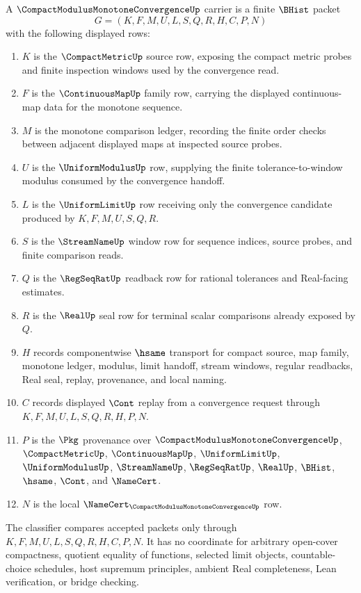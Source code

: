 \begin{definition}
\label{def:compact-modulus-monotone-convergence-carrier}
A $\CompactModulusMonotoneConvergenceUp$ carrier is a finite $\BHist$ packet
$$
G=(K,F,M,U,L,S,Q,R,H,C,P,N)
$$
with the following displayed rows:
\begin{enumerate}
\item $K$ is the $\CompactMetricUp$ source row, exposing the compact metric probes and finite inspection windows used by the convergence read.
\item $F$ is the $\ContinuousMapUp$ family row, carrying the displayed continuous-map data for the monotone sequence.
\item $M$ is the monotone comparison ledger, recording the finite order checks between adjacent displayed maps at inspected source probes.
\item $U$ is the $\UniformModulusUp$ row, supplying the finite tolerance-to-window modulus consumed by the convergence handoff.
\item $L$ is the $\UniformLimitUp$ row receiving only the convergence candidate produced by $K,F,M,U,S,Q,R$.
\item $S$ is the $\StreamNameUp$ window row for sequence indices, source probes, and finite comparison reads.
\item $Q$ is the $\RegSeqRatUp$ readback row for rational tolerances and Real-facing estimates.
\item $R$ is the $\RealUp$ seal row for terminal scalar comparisons already exposed by $Q$.
\item $H$ records componentwise $\hsame$ transport for compact source, map family, monotone ledger, modulus, limit handoff, stream windows, regular readbacks, Real seal, replay, provenance, and local naming.
\item $C$ records displayed $\Cont$ replay from a convergence request through $K,F,M,U,L,S,Q,R,H,P,N$.
\item $P$ is the $\Pkg$ provenance over $\CompactModulusMonotoneConvergenceUp$, $\CompactMetricUp$, $\ContinuousMapUp$, $\UniformLimitUp$, $\UniformModulusUp$, $\StreamNameUp$, $\RegSeqRatUp$, $\RealUp$, $\BHist$, $\hsame$, $\Cont$, and $\NameCert$.
\item $N$ is the local $\NameCert_{\CompactModulusMonotoneConvergenceUp}$ row.
\end{enumerate}
The classifier compares accepted packets only through $K,F,M,U,L,S,Q,R,H,C,P,N$. It has no coordinate for arbitrary open-cover compactness, quotient equality of functions, selected limit objects, countable-choice schedules, host supremum principles, ambient Real completeness, Lean verification, or bridge checking.
\end{definition}

